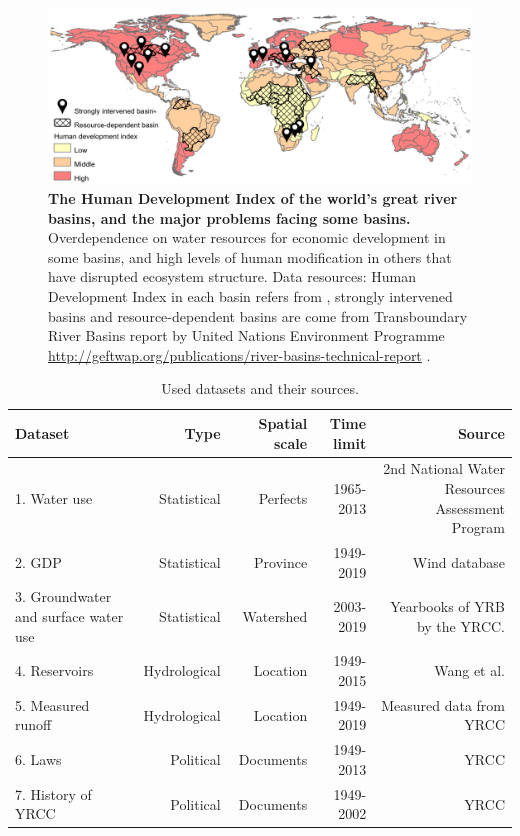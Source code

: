\documentclass[9pt,twoside,lineno]{pnas-new}
\begin{document}
\begin{figure}%
	\centering
	\includegraphics[width=\linewidth]{../../figures/main/map.pdf}
	\caption{
		\textbf{The Human Development Index of the world's great river basins, and the major problems facing some basins.}
		Overdependence on water resources for economic development in some basins, and high levels of human modification in others that have disrupted ecosystem structure. Data resources: Human Development Index in each basin refers from \cite{linkeGlobalHydroenvironmentalSubbasin2019}, strongly intervened basins and resource-dependent basins are come from Transboundary River Basins report by United Nations Environment Programme \url{http://geftwap.org/publications/river-basins-technical-report} \cite{unep-dhiTransboundaryRiverBasins2016}.
	}
	\label{fig:traps}
\end{figure}



\begin{table}\centering
    \caption{Used datasets and their sources.}
    
    \begin{tabular}{lrrrr}
    Dataset & Type & Spatial scale & Time limit & Source \\
    \midrule
    1. Water use & Statistical & Perfects & 1965-2013 & 2nd National Water Resources Assessment Program \\
    2. GDP & Statistical & Province & 1949-2019 & Wind database \\
    3. Groundwater and surface water use & Statistical & Watershed & 2003-2019 & Yearbooks of YRB by the YRCC. \\
    4. Reservoirs & Hydrological & Location & 1949-2015 & Wang et al. \cite{wangYellowRiverWater2019} \\
    5. Measured runoff & Hydrological & Location & 1949-2019 & Measured data from YRCC \\
    6. Laws & Political & Documents & 1949-2013 & YRCC \cite{yellowriverconservancycommissionYellowRiverBasin2013} \\
    7. History of YRCC & Political & Documents & 1949-2002 & YRCC \cite{ yellowriverarchivesOrganizationalHistoryYellow2004} \\
    \bottomrule
    \end{tabular}
\end{table}
\end{document}
